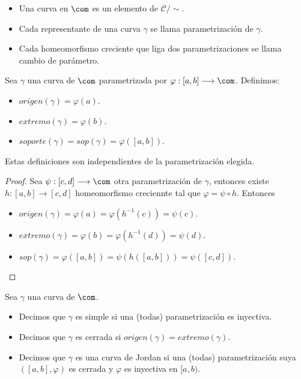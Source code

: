 \begin{defi}
\begin{itemize}
    \item Una curva en $\com$ es un elemento de $\mathscr{C}/\sim$.
    \item Cada representante de una curva $\gamma$ se llama parametrización de $\gamma$.
    \item Cada homeomorfismo creciente que liga dos parametrizaciones se llama cambio de parámetro.
\end{itemize}
\end{defi}

\begin{defi}
Sea $\gamma$ una curva de $\com$ parametrizada por $\varphi : [a,b] \longrightarrow \com$. Definimos:
\begin{itemize}
    \item $origen(\gamma) = \varphi(a)$.
    \item $extremo(\gamma) = \varphi(b)$.
    \item $soporte(\gamma) = sop(\gamma) = \varphi([a,b])$.
\end{itemize}
\end{defi}

\begin{obs}
Estas definiciones son independientes de la parametrización elegida.
\begin{proof}
Sea $\psi : [c,d] \longrightarrow \com$ otra parametrización de $\gamma$, entonces existe $h : [a,b] \longrightarrow [c,d]$ homeomorfismo creciennte tal que $\varphi = \psi \circ h$. Entonces
\begin{itemize}
    \item $origen(\gamma) = \varphi(a) = \varphi(h^{-1}(c)) = \psi(c)$.
    \item $extremo(\gamma) = \varphi(b) = \varphi(h^{-1}(d)) = \psi(d)$.
    \item $sop(\gamma) = \varphi([a,b]) = \psi(h([a,b])) = \psi([c,d])$.
\end{itemize}
\end{proof}
\end{obs}

\begin{defi}
Sea $\gamma$ una curva de $\com$.
\begin{itemize}
    \item Decimos que $\gamma$ es simple si una (todas) parametrización es inyectiva.
    \item Decimos que $\gamma$ es cerrada si $origen(\gamma) = extremo(\gamma)$.
    \item Decimos que $\gamma$ es una curva de Jordan si una (todas) parametrización suya $([a,b], \varphi)$ es cerrada y $\varphi$ es inyectiva en $[a,b)$.
\end{itemize}
\end{defi}

